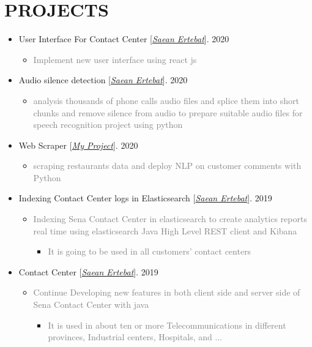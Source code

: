 \documentclass[10pt,a4paper,sans]{moderncv} %
\begin{document}
	\section{PROJECTS}
	\vspace{0.3em}
	\begin{itemize}
		
		\item User Interface For Contact Center [\href{http://www.senatelecom.com/}{\emph{Saean Ertebat}}]. \hfill 2020
		\begin{itemize}
			\item \textcolor{gray} {Implement new user interface using react js}
		\end{itemize}

		\item Audio silence detection [\href{http://www.senatelecom.com/}{\emph{Saean Ertebat}}]. \hfill 2020
		\begin{itemize}
			\item \textcolor{gray} {analysis thousands of phone calls audio files and splice them into short chunks and remove silence from audio to prepare suitable audio files for speech recognition project using python}
		\end{itemize}

		\item Web Scraper [\href{mailto:ma.mohammadizadeh@gmail.com}{\emph{My Project}}]. \hfill 2020
		\begin{itemize}
			\item \textcolor{gray} {scraping restaurants data and deploy NLP on customer comments with Python}
		\end{itemize}

		\item Indexing Contact Center logs in Elasticsearch [\href{http://www.senatelecom.com/}{\emph{Saean Ertebat}}]. \hfill 2019
		\begin{itemize}
			\item \textcolor{gray} {Indexing Sena Contact Center in elasticsearch to create analytics reports real time using elasticsearch Java High Level REST client and Kibana}
			\begin{itemize}
				\item \textcolor{gray} {It is going to be used in all customers’ contact centers}
			\end{itemize}
		\end{itemize}

		\item Contact Center [\href{http://www.senatelecom.com/}{\emph{Saean Ertebat}}]. \hfill 2019
		\begin{itemize}
			\item \textcolor{gray} {Continue Developing new features in both client side and server side of Sena Contact Center  with java}
			\begin{itemize}
				\item \textcolor{gray} {It is used in about ten or more Telecommunications in different provinces, Industrial centers, Hospitals, and ...}
			\end{itemize}
		\end{itemize}



\end{itemize}
\end{document}
